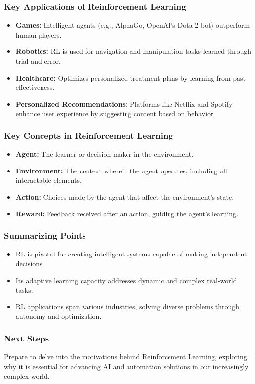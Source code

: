 \documentclass[aspectratio=169]{beamer}
\begin{document}
\begin{frame}[fragile]
    \frametitle{Key Applications of Reinforcement Learning}
    \begin{itemize}
        \item \textbf{Games:} Intelligent agents (e.g., AlphaGo, OpenAI's Dota 2 bot) outperform human players.
        \item \textbf{Robotics:} RL is used for navigation and manipulation tasks learned through trial and error.
        \item \textbf{Healthcare:} Optimizes personalized treatment plans by learning from past effectiveness.
        \item \textbf{Personalized Recommendations:} Platforms like Netflix and Spotify enhance user experience by suggesting content based on behavior.
    \end{itemize}
\end{frame}

\begin{frame}[fragile]
    \frametitle{Key Concepts in Reinforcement Learning}
    \begin{itemize}
        \item \textbf{Agent:} The learner or decision-maker in the environment.
        \item \textbf{Environment:} The context wherein the agent operates, including all interactable elements.
        \item \textbf{Action:} Choices made by the agent that affect the environment's state.
        \item \textbf{Reward:} Feedback received after an action, guiding the agent's learning.
    \end{itemize}
\end{frame}

\begin{frame}[fragile]
    \frametitle{Summarizing Points}
    \begin{itemize}
        \item RL is pivotal for creating intelligent systems capable of making independent decisions.
        \item Its adaptive learning capacity addresses dynamic and complex real-world tasks.
        \item RL applications span various industries, solving diverse problems through autonomy and optimization.
    \end{itemize}
\end{frame}

\begin{frame}[fragile]
    \frametitle{Next Steps}
    Prepare to delve into the motivations behind Reinforcement Learning, exploring why it is essential for advancing AI and automation solutions in our increasingly complex world.
\end{frame}
\end{document}
